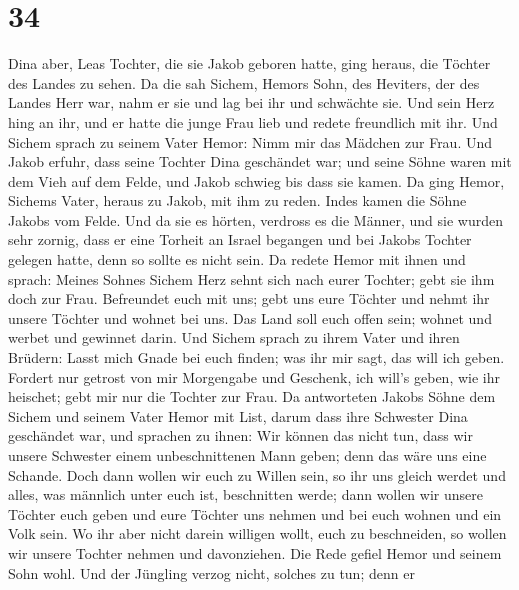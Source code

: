 \hypertarget{section-33}{%
\section{34}\label{section-33}}

 Dina aber, Leas Tochter, die sie Jakob geboren hatte,
ging heraus, die Töchter des Landes zu sehen.  Da die sah
Sichem, Hemors Sohn, des Heviters, der des Landes Herr war, nahm er sie
und lag bei ihr und schwächte sie.  Und sein Herz hing an
ihr, und er hatte die junge Frau lieb und redete freundlich mit ihr.
 Und Sichem sprach zu seinem Vater Hemor: Nimm mir das
Mädchen zur Frau.  Und Jakob erfuhr, dass seine Tochter
Dina geschändet war; und seine Söhne waren mit dem Vieh auf dem Felde,
und Jakob schwieg bis dass sie kamen.  Da ging Hemor,
Sichems Vater, heraus zu Jakob, mit ihm zu reden.  Indes
kamen die Söhne Jakobs vom Felde. Und da sie es hörten, verdross es die
Männer, und sie wurden sehr zornig, dass er eine Torheit an Israel
begangen und bei Jakobs Tochter gelegen hatte, denn so sollte es nicht
sein.  Da redete Hemor mit ihnen und sprach: Meines Sohnes
Sichem Herz sehnt sich nach eurer Tochter; gebt sie ihm doch zur Frau.
 Befreundet euch mit uns; gebt uns eure Töchter und nehmt
ihr unsere Töchter  und wohnet bei uns. Das Land soll
euch offen sein; wohnet und werbet und gewinnet darin. 
Und Sichem sprach zu ihrem Vater und ihren Brüdern: Lasst mich Gnade bei
euch finden; was ihr mir sagt, das will ich geben. 
Fordert nur getrost von mir Morgengabe und Geschenk, ich will's geben,
wie ihr heischet; gebt mir nur die Tochter zur Frau.  Da
antworteten Jakobs Söhne dem Sichem und seinem Vater Hemor mit List,
darum dass ihre Schwester Dina geschändet war,  und
sprachen zu ihnen: Wir können das nicht tun, dass wir unsere Schwester
einem unbeschnittenen Mann geben; denn das wäre uns eine Schande.
 Doch dann wollen wir euch zu Willen sein, so ihr uns
gleich werdet und alles, was männlich unter euch ist, beschnitten werde;
 dann wollen wir unsere Töchter euch geben und eure
Töchter uns nehmen und bei euch wohnen und ein Volk sein.
 Wo ihr aber nicht darein willigen wollt, euch zu
beschneiden, so wollen wir unsere Tochter nehmen und davonziehen.
 Die Rede gefiel Hemor und seinem Sohn wohl.
 Und der Jüngling verzog nicht, solches zu tun; denn er
